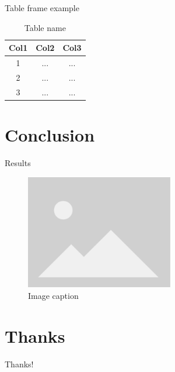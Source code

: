 \documentclass{beamer}
\begin{document}
\begin{frame}{Table frame example}

\begin{table}
    \begin{tabular}{c|cc}
        \textbf{Col1} & Col2 & Col3 \\
        \hline
        1            & ...                    & ...             \\
        2            & ...                    & ...             \\
        3            & ...                    & ...             \\
    \end{tabular}
    \caption{Table name}
    \label{tab:table1}
\end{table}

\end{frame}

\section{Conclusion}

\begin{frame}{Results}
    \begin{figure}
        \centering
        \includegraphics[height=5cm]{images/placeholder_image.png}
        \caption{Image caption}
        \label{fig:figure2}
    \end{figure}
\end{frame}

\section*{Thanks}

\begin{frame}
    \begin{center}
        \Huge Thanks!
    \end{center}
\end{frame}
\end{document}
